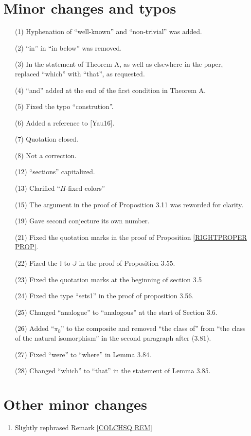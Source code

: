 \documentclass[a4paper,10pt
]{article}%
\numberwithin{equation}{section}
\numberwithin{figure}{section}
\theoremstyle{definition} %
\newcommand{\1}{\ensuremath{\mathbbm 1}}%
\begin{document}
\section{Minor changes and typos}
 

\begin{enumerate}
\item[(1)] Hyphenation of ``well-known'' and ``non-trivial'' was added.
\item[(2)] ``in'' in ``in below'' was removed.
\item[(3)] In the statement of Theorem A, as well as elsewhere in the paper, replaced ``which'' with ``that'', as requested.
\item[(4)] ``and'' added at the end of the first condition in Theorem A.
\item[(5)] Fixed the typo ``constrution''. 
\item[(6)] Added a reference to [Yau16].
\item[(7)] Quotation closed.
\item[(8)] Not a correction.
\item[(12)] ``sections'' capitalized.
\item[(13)] Clarified ``$H$-fixed colors''
\item[(15)] The argument in the proof of Proposition 3.11 was reworded for clarity.
\item[(19)] Gave second conjecture its own number.
\item[(21)] Fixed the quotation marks in the proof of Proposition \ref{RIGHTPROPER PROP}.
\item[(22)] Fized the $\mathbb{I}$ to $\mathbb{J}$
in the proof of Proposition 3.55.
\item[(23)] Fixed the quotation marks at the beginning of section 3.5
\item[(24)] Fixed the type ``sets1'' in the proof of proposition 3.56.
\item[(25)] Changed ``analogue'' to ``analogous'' at the start of Section 3.6.
\item[(26)] Added ``$\pi_0$'' to the composite and removed ``the class of'' from ``the class of the natural isomorphism'' in the second paragraph after (3.81).
\item[(27)] Fixed ``were'' to ``where'' in Lemma 3.84.
\item[(28)] Changed ``which'' to ``that'' in the statement of Lemma 3.85.
\end{enumerate}

\section{Other minor changes}

\begin{enumerate}
\item Slightly rephrased Remark \ref{COLCHSQ REM}
\end{enumerate}





% 
\end{document}
